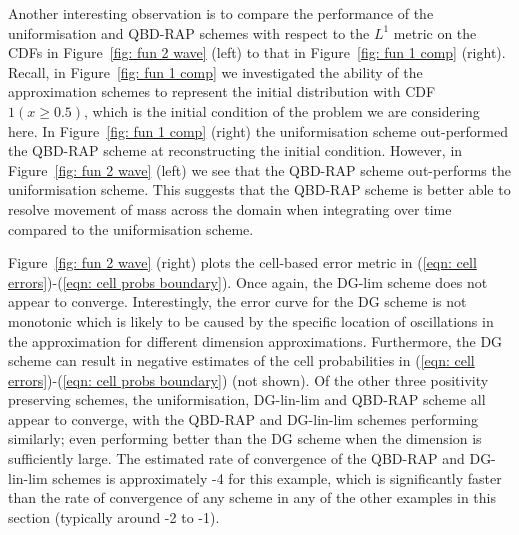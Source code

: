 \begin{example}
Another interesting observation is to compare the performance of the uniformisation and QBD-RAP schemes with respect to the \(L^1\) metric on the CDFs in Figure~\ref{fig: fun 2 wave} (left) to that in Figure~\ref{fig: fun 1 comp} (right). Recall, in Figure~\ref{fig: fun 1 comp} we investigated the ability of the approximation schemes to represent the initial distribution with CDF \(1(x\geq 0.5)\), which is the initial condition of the problem we are considering here. In Figure~\ref{fig: fun 1 comp} (right) the uniformisation scheme out-performed the QBD-RAP scheme at reconstructing the initial condition. However, in Figure~\ref{fig: fun 2 wave} (left) we see that the QBD-RAP scheme out-performs the uniformisation scheme. This suggests that the QBD-RAP scheme is better able to resolve movement of mass across the domain when integrating over time compared to the uniformisation scheme.  

Figure~\ref{fig: fun 2 wave} (right) plots the cell-based error metric in (\ref{eqn: cell errors})-(\ref{eqn: cell probs boundary}). Once again, the DG-lim scheme does not appear to converge. Interestingly, the error curve for the DG scheme is not monotonic which is likely to be caused by the specific location of oscillations in the approximation for different dimension approximations. Furthermore, the DG scheme can result in negative estimates of the cell probabilities in (\ref{eqn: cell errors})-(\ref{eqn: cell probs boundary}) (not shown). Of the other three positivity preserving schemes, the uniformisation, DG-lin-lim and QBD-RAP scheme all appear to converge, with the QBD-RAP and DG-lin-lim schemes performing similarly; even performing better than the DG scheme when the dimension is sufficiently large. The estimated rate of convergence of the QBD-RAP and DG-lin-lim schemes is approximately -4 for this example, which is significantly faster than the rate of convergence of any scheme in any of the other examples in this section (typically around -2 to -1). 
\end{example}

